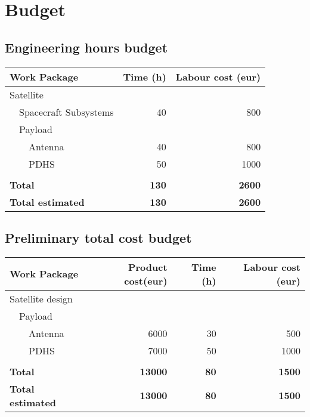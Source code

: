 \documentclass[12pt, titlepage]{article}
\begin{document}
\section{Budget}


\subsection{Engineering hours budget}
\begin{tabular}{ | l | r | r | }
\hline
Work Package & Time (h) & Labour cost (eur) \\ \hline
Satellite &  &  \\ \hline
~~Spacecraft Subsystems & 40 & 800 \\ \hline
~~Payload &  &  \\ \hline
~~~~Antenna & 40 & 800 \\ \hline
~~~~PDHS & 50 & 1000 \\ \hline
 &  &  \\ \hline
\textbf{Total} & \textbf{130} & \textbf{2600} \\ \hline
\textbf{Total estimated} & \textbf{130} & \textbf{2600} \\
\hline
\end{tabular}
 

\subsection{Preliminary total cost budget} 
\begin{tabular}{ | l | r | r | r | }
\hline
Work Package & Product cost(eur) & Time (h) & Labour cost (eur) \\ \hline
Satellite design &  &  &  \\ \hline
~~Payload &  &  &  \\ \hline
~~~~Antenna & 6000 & 30 & 500 \\ \hline
~~~~PDHS & 7000  & 50 & 1000 \\ \hline
 &  &  &  \\ \hline
\textbf{Total} & \textbf{13000} & \textbf{80} & \textbf{1500} \\ \hline
\textbf{Total estimated} & \textbf{13000} & \textbf{80} & \textbf{1500} \\
\hline
\end{tabular}


\pagebreak


\end{document}
